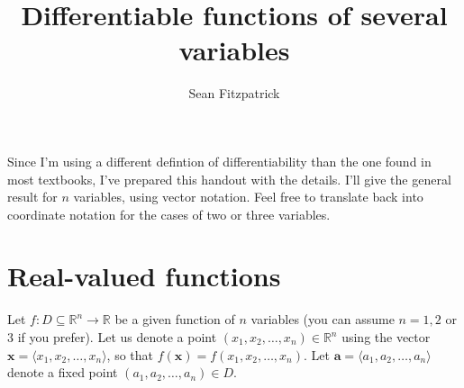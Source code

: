\documentclass[12pt,letterpaper]{article}
\title{Differentiable functions of several variables}
\author{Sean Fitzpatrick}
\newcommand{\R}{\mathbb{R}}
\newcommand{\x}{\mathbf{x}}
\newcommand{\aaa}{\mathbf{a}}
\begin{document}
\maketitle

Since I'm using a different defintion of differentiability than the one found in most textbooks, I've prepared this handout with the details. I'll give the general result for $n$ variables, using vector notation. Feel free to translate back into coordinate notation for the cases of two or three variables.
\section{Real-valued functions}
Let $f:D\subseteq \R^n\to \R$ be a given function of $n$ variables (you can assume $n=1, 2$ or 3 if you prefer). Let us denote a point $(x_1,x_2,\ldots, x_n)\in\R^n$ using the vector $\x = \langle x_1,x_2,\ldots, x_n\rangle$, so that $f(\x) = f(x_1,x_2,\ldots,x_n)$. Let $\aaa = \langle a_1,a_2,\ldots, a_n\rangle$ denote a fixed point $(a_1,a_2,\ldots, a_n)\in D$.
\end{document}
